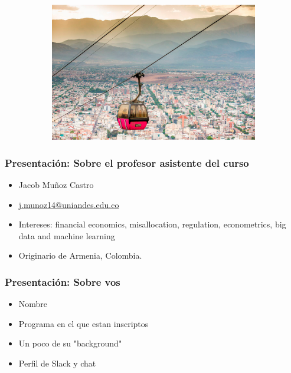 \documentclass[
  shownotes,
  xcolor={svgnames},
  hyperref={colorlinks,citecolor=DarkBlue,linkcolor=DarkRed,urlcolor=DarkBlue}
  ]{beamer}
\begin{document}
\begin{frame}
\begin{figure}[H]
\begin{subfigure}{0.45\linewidth}
  \end{subfigure}
  \begin{subfigure}{0.45\linewidth}
    \centering
    \includegraphics[scale=0.13]{figures/salta1}
  \end{subfigure}
\end{figure}

\end{frame}


\begin{frame}
\frametitle{Presentación: Sobre el profesor asistente del curso}

  \begin{itemize}
      \item  Jacob Muñoz Castro
      \medskip
      \item \href{mailto:j.munoz14@uniandes.edu.co}{j.munoz14@uniandes.edu.co}
      \medskip
      \item Intereses: financial economics, misallocation, regulation, econometrics,  big data and machine learning
      \medskip
      \item Originario de Armenia, Colombia.

  \end{itemize}

\end{frame}

\begin{frame}
\frametitle{Presentación: Sobre vos}

    \begin{itemize}
      \item Nombre
      \bigskip
      \item Programa en el que estan inscriptos
      \bigskip
      \item Un poco de su "background" 
      \bigskip
      \item Perfil de Slack y chat
    \end{itemize}
\end{frame}
\end{document}

